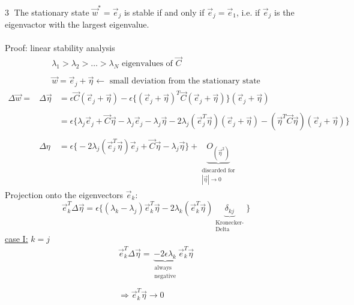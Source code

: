 \documentclass[a4paper,11pt]{article}
\begin{document}
\textcircled{3} The stationary state $\vec{w}^* = \vec{e}_j$ is stable if and only if $\vec{e}_j = \vec{e}_1$, i.e. if $\vec{e}_j$ is the eigenvactor with the largest eigenvalue.\\\\
Proof: linear stability analysis
\[ \begin{array}{l}
	\lambda_1 > \lambda_2 > \ldots > \lambda_N \text{ eigenvalues of } 
		\vec{C} \\\\
	\vec{w} = \vec{e}_j + \vec{\eta} \leftarrow \text{ small deviation
		from the stationary state}
\end{array} \]
\begin{equation}
	\begin{array}{lll}
	\Delta \vec{w} =
	& \Delta \vec{\eta} 
	& = \epsilon \vec{C} (\vec{e}_j + \vec{\eta}) - \epsilon \Big\{
		(\vec{e}_j + \vec{\eta})^T \vec{C} (\vec{e}_j + \vec{\eta})
		\Big\} (\vec{e}_j + \vec{\eta}) \\\\
	&& = \epsilon \Big\{ \lambda_j \vec{e}_j + \vec{C} \vec{\eta} 
		- \lambda_j \vec{e}_j - \lambda_j \vec{\eta} 
		- 2 \lambda_j (\vec{e}_j^T \vec{\eta}) (\vec{e}_j + \vec{\eta})
		- (\vec{\eta}^T \vec{C} \vec{\eta})(\vec{e}_j + \vec{\eta})
		\Big\} \\\\
	& \Delta{\eta} 
	& = \epsilon \Big\{ - 2 \lambda_j (\vec{e}_j^T \vec{\eta}) \vec{e}_j
		+ \vec{C} \vec{\eta} - \lambda_j \vec{\eta}
		\Big\} + \underbrace{ O_{(\vec{\eta}^2)} }_{
			\substack{ \text{discarded for} \\ |\vec{\eta}| 
				\rightarrow 0}}
	\end{array}
\end{equation}
Projection onto the eigenvectors $\vec{e}_k$:
\begin{equation}
	\vec{e}_k^T \Delta \vec{\eta} = \epsilon \Big\{
		(\lambda_k - \lambda_j) \vec{e}_k^T \vec{\eta} 
		- 2 \lambda_k (\vec{e}_k^T \vec{\eta}) 
		\underbrace{ \delta_{kj} }_{\substack{
			\text{Kronecker-} \\ \text{Delta}}}
		\Big\}
\end{equation}
\underline{case I:} $k = j$
\begin{equation}
	\begin{array}{l}
		\vec{e}_k^T \Delta \vec{\eta} = 
		\underbrace{ -2 \epsilon \lambda_k}_{
			\substack{\text{always} \\ \text{negative}}}
		\vec{e}_k^T \vec{\eta} \\\\
		\Rightarrow \vec{e}_k^T \vec{\eta} \rightarrow 0
	\end{array}
\end{equation}
\end{document}

